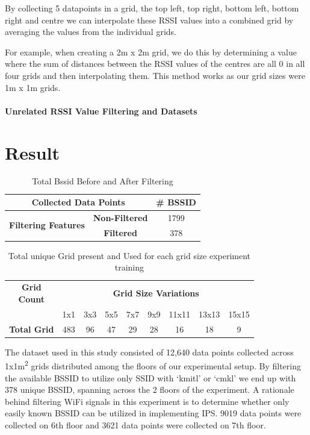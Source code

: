 \documentclass[conference]{IEEEtran}
\begin{document}
	By collecting 5 datapoints in a grid, the top left, top right, bottom left, bottom right and centre we can interpolate these RSSI values into a combined grid by averaging the values from the individual grids.
	
	For example, when creating a 2m x 2m grid, we do this by determining a value where the sum of distances between the RSSI values of the centres are all 0 in all four grids and then interpolating them. This method works as our grid sizes were 1m x 1m grids.
	
	\paragraph{Unrelated RSSI Value Filtering and Datasets}
	
	
	\section{Result}
	\begin{table}[htbp]
		\centering
		\begin{tabular}{|c|c|c|}
			\hline
			\multicolumn{2}{|c|}{\textbf{Collected Data Points}} & \textbf{\# BSSID} \\
			\hline
			\multirow{2}{*}{\textbf{Filtering Features}} & \textbf{Non-Filtered} & 1799 \\
			\cline{2-3}
			& \textbf{Filtered}     & 378  \\
			\hline
		\end{tabular}
		\caption{Total Bssid Before and After Filtering}
		\label{tab:bssid_counts}
	\end{table}
	
	\begin{table}[htbp]
		\centering
		\begin{tabular}{|c|c|c|c|c|c|c|c|c|}
			\hline
			\makecell{\textbf{Grid}\\\textbf{Count}} & \multicolumn{8}{c|}{\textbf{Grid Size Variations}} \\
			\cline{2-9}
			& 1x1 & 3x3 & 5x5 & 7x7 & 9x9 & 11x11 & 13x13 & 15x15 \\
			\hline
			\textbf{Total Grid} & 483 & 96 & 47 & 29 & 28 & 16 & 18 & 9 \\
			\hline
		\end{tabular}
		\caption{Total unique Grid present and Used for each grid size experiment training}
		\label{tab:grid_size_variations}
	\end{table}
	
	The dataset used in this study consisted of 12,640 data points collected across 1x1m\textsuperscript{2} grids distributed among the floors of our experimental setup. By filtering the available BSSID to utilize only SSID with ‘kmitl’ or ‘cmkl’ we end up with 378 unique BSSID, spanning across the 2 floors of the experiment. A rationale behind filtering WiFi signals in this experiment is to determine whether only easily known BSSID can be utilized in implementing IPS. 9019 data points were collected on 6th floor and 3621 data points were collected on 7th floor.
	
\end{document}
